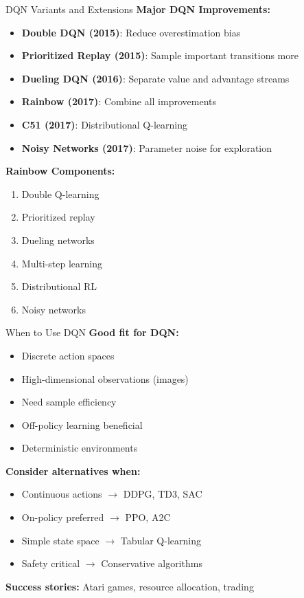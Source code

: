 \documentclass[aspectratio=169,10pt]{beamer}
\begin{document}
\begin{frame}{DQN Variants and Extensions}
\textbf{Major DQN Improvements:}
\begin{itemize}
    \item \textbf{Double DQN (2015)}: Reduce overestimation bias
    \item \textbf{Prioritized Replay (2015)}: Sample important transitions more
    \item \textbf{Dueling DQN (2016)}: Separate value and advantage streams
    \item \textbf{Rainbow (2017)}: Combine all improvements
    \item \textbf{C51 (2017)}: Distributional Q-learning
    \item \textbf{Noisy Networks (2017)}: Parameter noise for exploration
\end{itemize}

\vspace{0.3cm}
\textbf{Rainbow Components:}
\begin{enumerate}
    \item Double Q-learning
    \item Prioritized replay
    \item Dueling networks
    \item Multi-step learning
    \item Distributional RL
    \item Noisy networks
\end{enumerate}
\end{frame}

\begin{frame}{When to Use DQN}
\textbf{Good fit for DQN:}
\begin{itemize}
    \item Discrete action spaces
    \item High-dimensional observations (images)
    \item Need sample efficiency
    \item Off-policy learning beneficial
    \item Deterministic environments
\end{itemize}

\vspace{0.3cm}
\textbf{Consider alternatives when:}
\begin{itemize}
    \item Continuous actions $\rightarrow$ DDPG, TD3, SAC
    \item On-policy preferred $\rightarrow$ PPO, A2C
    \item Simple state space $\rightarrow$ Tabular Q-learning
    \item Safety critical $\rightarrow$ Conservative algorithms
\end{itemize}

\vspace{0.3cm}
\textbf{Success stories:} Atari games, resource allocation, trading
\end{frame}
\end{document}
